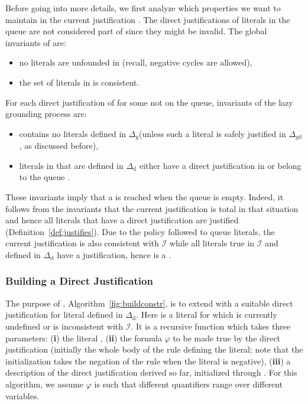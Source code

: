 \documentclass[11pt]{article}
\newcommand{\m}[1]{\ensuremath{#1}\xspace}
\newcommand{\I}{\m{\mathcal{I}}}
\newcommand{\D}{\m{\Delta}}
\newcommand{\f}{\m{\varphi}}
\theoremstyle{plain}
\theoremstyle{definition}
\theoremstyle{example_basic}
\theoremstyle{example_contd}
\theoremstyle{plain}
\newcommand{\Dg}{\ensuremath{\D_\text{g}}\xspace}
\newcommand{\Dd}{\ensuremath{\D_\text{d}}\xspace}
\newcommand{\Dgd}{\ensuremath{\D_\text{gd}}\xspace}
\newcommand{\tbf}[1]{\textbf{#1}}
\newcommand{\change}[1]{#1}
\begin{document}
Before going into more details, we first analyze which properties we want to maintain in the current justification \jgraph. The direct justifications of literals in the \changes queue are not considered part of \jgraph since they might be invalid. The global invariants of \jgraph are:
\begin{itemize}
\item \change{no literals are unfounded in \jgraph (recall, negative cycles are allowed)},
\item the set of literals in \jgraph is consistent.
\end{itemize}
For each direct justification  of \jgraph for some  not on the queue, invariants of the lazy grounding process are:
\begin{itemize}
\item \change{ contains no literals defined in \Dg (unless such a literal is safely justified in \Dgd, as discussed before)},
\item literals in  that are defined in \Dd either have a direct justification in   or belong to the queue \changes.
\end{itemize}

These invariants imply that a \dstate is reached when the \changes queue is empty. Indeed, it follows from the invariants that the current justification is total in that situation and hence all literals that have a direct justification are justified (Definition~\ref{def:justifies}). Due to the policy followed to queue literals, the current justification is also consistent with \I while all literals true in \I and defined in \Dd have a justification, hence  is a \dstate.


\subsubsection{Building a Direct Justification}
The purpose of \buildconstr, Algorithm~\ref{fig:buildconstr}, is to extend \jgraph with  a suitable direct justification for  literal  defined in \Dd. Here  is a literal for which  is currently undefined or is inconsistent with \I. It is a recursive function which takes three parameters: (\tbf{i}) the literal , (\tbf{ii}) the formula \f to be made true by the direct justification (initially the whole body of the rule defining the literal; note that the initialization takes the negation of the rule when the literal is negative), (\tbf{iii}) a description of the direct justification derived so far, initialized through . \change{For this algorithm, we assume \f is such that different quantifiers range over different variables.}
 
\end{document}
